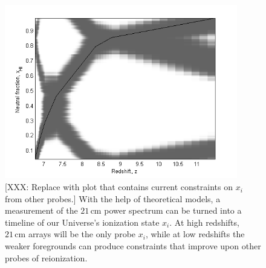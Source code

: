 \documentclass[preprint]{aastex}
\begin{document}

\begin{figure}[!ht]\centering
\includegraphics[width=4in]{plots/constraints.png}
\caption{\small
[XXX: Replace with plot that contains current constraints on $x_i$ from other probes.]
With the help of theoretical models, a measurement of the $21\,\textrm{cm}$ power spectrum
can be turned into a timeline of our Universe's ionization state $x_i$.  At high redshifts, 
$21\,\textrm{cm}$ arrays will be the only probe $x_i$, while at low redshifts the weaker
foregrounds can produce constraints that improve upon other probes of reionization.
}\label{fig:x_i}
\end{figure}
\end{document}
